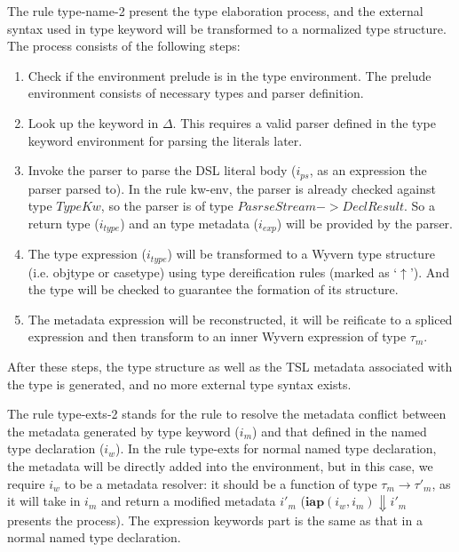 \documentclass{sig-alternate}
\begin{document}
The rule type-name-2 present the type elaboration process, and the external syntax used in type keyword will be transformed to a normalized type structure. The process consists of the following steps:
\begin{enumerate}\setlength{\itemsep}{0pt}
\item Check if the environment prelude is in the type environment. The prelude environment consists of necessary types and parser definition. 
\item Look up the keyword in $\Delta$. This requires a valid parser defined in the type keyword environment for parsing the literals later.
\item Invoke the parser to parse the DSL literal body ($i_{ps}$, as an expression the parser parsed to). In the rule kw-env, the parser is already checked against type $TypeKw$, so the parser is of type $PasrseStream->DeclResult$. So a return type ($i_{type}$) and an type metadata ($i_{exp}$) will be provided by the parser.
\item The type expression ($i_{type}$) will be transformed to a Wyvern type structure (i.e. objtype or casetype) using type dereification rules (marked as `$\uparrow$'). And the type will be checked to guarantee the formation of its structure.
\item The metadata expression will be reconstructed, it will be reificate to a spliced expression and then transform to an inner Wyvern expression of type $\tau_m$. 
\end{enumerate} 
After these steps, the type structure as well as the TSL metadata associated with the type is generated, and no more external type syntax exists.

The rule type-exts-2 stands for the rule to resolve the metadata conflict between the metadata generated by type keyword ($i_m$) and that defined in the named type declaration ($i_w$). In the rule type-exts for normal named type declaration, the metadata will be directly added into the environment, but in this case, we require $i_w$ to be a metadata resolver: it should be a function of type $\tau_m\rightarrow\tau'_m$, as it will take in $i_m$ and return a modified metadata $i'_m$ ($\mathbf{iap}(i_w, i_m)\Downarrow i'_m$ presents the process). The expression keywords part is the same as that in a normal named type declaration.

\end{document}
